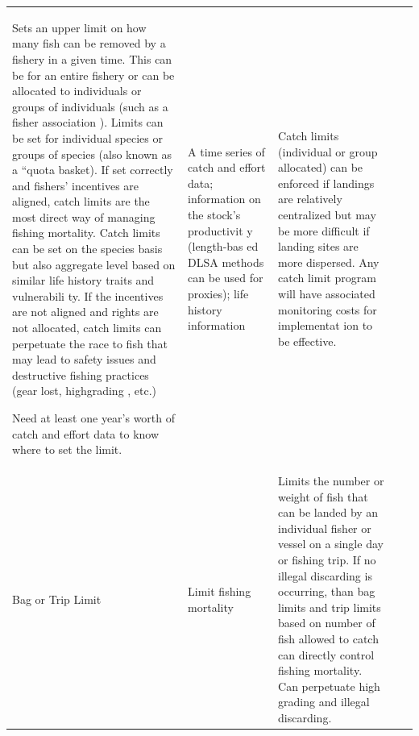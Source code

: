 \documentclass[]{book}
\begin{document}
\begin{longtable}[]{@{}lllll@{}}
\begin{minipage}[t]{0.19\columnwidth}
Sets an upper limit on how many fish can be removed by a fishery in a
given time. This can be for an entire fishery or can be allocated to
individuals or groups of individuals (such as a fisher association ).
Limits can be set for individual species or groups of species (also
known as a ``quota basket). If set correctly and fishers' incentives are
aligned, catch limits are the most direct way of managing fishing
mortality. Catch limits can be set on the species basis but also
aggregate level based on similar life history traits and vulnerabili ty.
If the incentives are not aligned and rights are not allocated, catch
limits can perpetuate the race to fish that may lead to safety issues
and destructive fishing practices (gear lost, highgrading , etc.)

Need at least one year's worth of catch and effort data to know where to
set the limit.\strut
\end{minipage} & \begin{minipage}[t]{0.19\columnwidth}\raggedright\strut
A time series of catch and effort data; information on the stock's
productivit y (length-bas ed DLSA methods can be used for proxies); life
history information\strut
\end{minipage} & \begin{minipage}[t]{0.19\columnwidth}\raggedright\strut
Catch limits (individual or group allocated) can be enforced if landings
are relatively centralized but may be more difficult if landing sites
are more dispersed. Any catch limit program will have associated
monitoring costs for implementat ion to be effective.\strut
\end{minipage}\tabularnewline
\begin{minipage}[t]{0.17\columnwidth}\raggedright\strut
Bag or Trip Limit\strut
\end{minipage} & \begin{minipage}[t]{0.17\columnwidth}\raggedright\strut
Limit fishing mortality\strut
\end{minipage} & \begin{minipage}[t]{0.17\columnwidth}\raggedright\strut
Limits the number or weight of fish that can be landed by an individual
fisher or vessel on a single day or fishing trip. If no illegal
discarding is occurring, than bag limits and trip limits based on number
of fish allowed to catch can directly control fishing mortality. Can
perpetuate high grading and illegal discarding.\strut
\end{minipage} & \begin{minipage}[t]{0.17\columnwidth}\raggedright\strut

\end{minipage}
\end{longtable}
\end{document}
